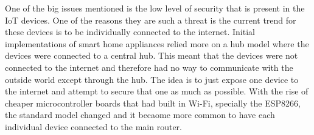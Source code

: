 \documentclass[acmlarge]{acmart}
\begin{document}

One of the big issues mentioned is the low level of security that is present in the IoT devices. One of the reasons they are such a threat is the current trend for these devices is to be individually connected to the internet. Initial implementations of smart home appliances relied more on a hub model where the devices were connected to a central hub. This meant that the devices were not connected to the internet and therefore had no way to communicate with the outside world except through the hub. The idea is to just expose one device to the internet and attempt to secure that one as much as possible. With the rise of cheaper microcontroller boards that had built in Wi-Fi, specially the ESP8266, the standard model changed and it becaome more common to have each individual device connected to the main router. 








\end{document}
